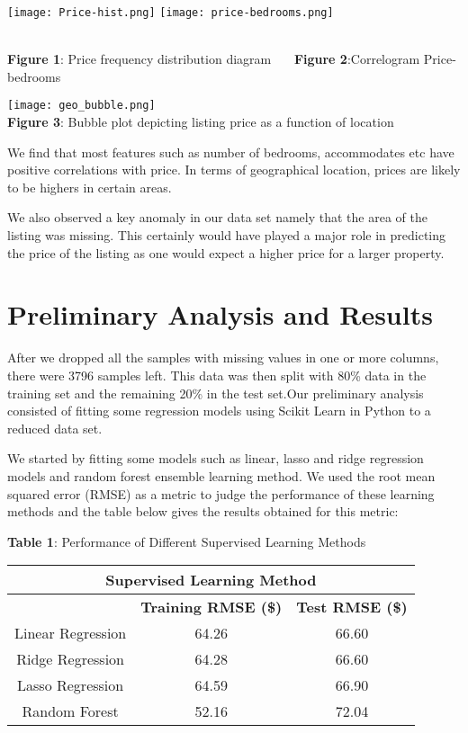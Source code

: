 \documentclass[12pt]{article}
\begin{document}
\noindent 

\begin{center}
\texttt{[image: Price-hist.png]}
\texttt{[image: price-bedrooms.png]}
\end{center}
\\\textbf{Figure 1}: Price frequency distribution diagram \,\,\,\,\,\,\,
   \textbf{Figure 2}:Correlogram Price-bedrooms


\begin{center}
\texttt{[image: geo\_bubble.png]}
\\\textbf{Figure 3}: Bubble plot depicting listing price as a function of location
\end{center}


\noindent We find that most features such as number of bedrooms, accommodates etc have positive correlations with price. In terms of geographical location, prices are likely to be highers in certain areas. 

\noindent We also observed a key anomaly in our data set namely that the area of the listing was missing. This certainly would have played a major role in predicting the price of the listing as one would expect a higher price for a larger property.

\section*{Preliminary Analysis and Results}
\noindent After we dropped all the samples with missing values in one or more columns, there were 3796 samples left. This data was then split with 80\% data in the training set and the remaining 20\% in the test set.Our preliminary analysis consisted of fitting some regression models using Scikit Learn in Python to a reduced data set.

\noindent We started by fitting some models such as linear, lasso and ridge regression models and random forest ensemble learning method. We used the root mean squared error (RMSE) as a metric to judge the performance of these learning methods and the table below gives the results obtained for this metric:

\begin{center}
\textbf{Table 1}: Performance of Different Supervised Learning Methods \\[0.3cm] 
\begin{tabular}{ |c|c|c| } 
 \hline
 \multicolumn{3}{|c|}{\textbf{Supervised Learning Method}}\\
 
 \hline 

  & \textbf{Training RMSE (\$)}  & \textbf{Test RMSE (\$)} \\ [0.1cm]
 \hline
  Linear Regression & 64.26 & 66.60 \\ 
 \hline
 Ridge Regression &64.28   &66.60   \\ 
 \hline
 Lasso Regression   &  64.59 & 66.90 \\
 \hline
 Random Forest &52.16  &72.04  \\
 \hline

\end{tabular}

\end{center}
\end{document}
